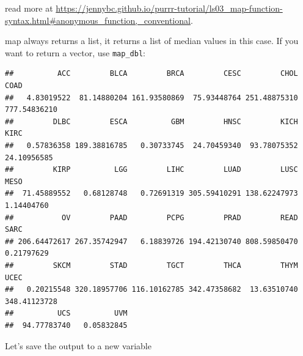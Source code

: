 \documentclass[
]{book}
\newenvironment{Shaded}{\begin{snugshade}}{\end{snugshade}}
\newcommand{\CommentTok}[1]{\textcolor[rgb]{0.56,0.35,0.01}{\textit{#1}}}
\newcommand{\ControlFlowTok}[1]{\textcolor[rgb]{0.13,0.29,0.53}{\textbf{#1}}}
\newcommand{\FunctionTok}[1]{\textcolor[rgb]{0.13,0.29,0.53}{\textbf{#1}}}
\newcommand{\NormalTok}[1]{#1}
\newcommand{\OtherTok}[1]{\textcolor[rgb]{0.56,0.35,0.01}{#1}}
\newcommand{\SpecialCharTok}[1]{\textcolor[rgb]{0.81,0.36,0.00}{\textbf{#1}}}
\begin{document}
read more at \url{https://jennybc.github.io/purrr-tutorial/ls03_map-function-syntax.html\#anonymous_function,_conventional}.

map always returns a list, it returns a list of median values in this case. If you want to return a vector, use \texttt{map\_dbl}:

\begin{Shaded}
\end{Shaded}

\begin{verbatim}
##          ACC         BLCA         BRCA         CESC         CHOL         COAD 
##   4.83019522  81.14880204 161.93580869  75.93448764 251.48875310 777.54836210 
##         DLBC         ESCA          GBM         HNSC         KICH         KIRC 
##   0.57836358 189.38816785   0.30733745  24.70459340  93.78075352  24.10956585 
##         KIRP          LGG         LIHC         LUAD         LUSC         MESO 
##  71.45889552   0.68128748   0.72691319 305.59410291 138.62247973   1.14404760 
##           OV         PAAD         PCPG         PRAD         READ         SARC 
## 206.64472617 267.35742947   6.18839726 194.42130740 808.59850470   0.21797629 
##         SKCM         STAD         TGCT         THCA         THYM         UCEC 
##   0.20215548 320.18957706 116.10162785 342.47358682  13.63510740 348.41123728 
##          UCS          UVM 
##  94.77783740   0.05832845
\end{verbatim}

Let's save the output to a new variable

\begin{Shaded}
\end{Shaded}
\end{document}
